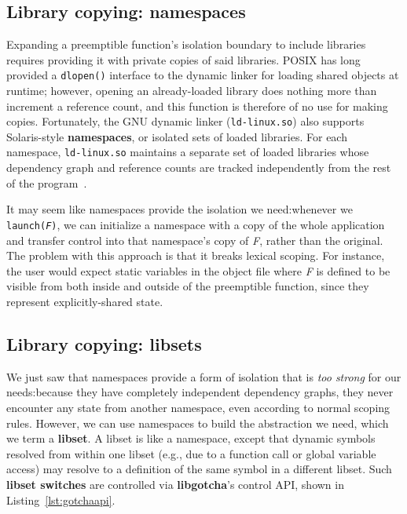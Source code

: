\subsection{Library copying: namespaces}

Expanding a preemptible function's isolation boundary to include libraries requires
providing it with private copies of said libraries.  POSIX has long provided a
\texttt{dlopen()} interface to the dynamic linker for loading shared objects at
runtime; however, opening an already-loaded library does nothing more than increment
a reference count, and this function is therefore of no use for making copies.
Fortunately, the GNU dynamic linker (\texttt{ld-linux.so}) also supports
Solaris-style \textbf{namespaces}, or isolated sets of loaded libraries.  For each
namespace, \texttt{ld-linux.so} maintains a separate set of loaded libraries whose
dependency graph and reference counts are tracked independently from the rest of the
program~\cite{dlmopen-manpage}.

It may seem like namespaces provide the isolation we need:\@ whenever we
\texttt{launch(\textnormal{\textit{F}})}, we can initialize a namespace with a copy
of the whole application and transfer control into that namespace's copy of
\textit{F}, rather than the original.  The problem with this approach is that it
breaks lexical scoping.  For instance, the user would expect static variables in the
object file where \textit{F} is defined to be visible from both inside and outside of
the preemptible function, since they represent explicitly-shared state.



\subsection{Library copying: libsets}

We just saw that namespaces provide a form of isolation that is \textit{too strong}
for our needs:\@ because they have completely independent dependency graphs, they
never encounter any state from another namespace, even according to normal scoping
rules.  However, we can use namespaces to build the abstraction we need, which we
term a \textbf{libset}.  A libset is like a namespace, except that dynamic symbols
resolved from within one libset (e.g., due to a function call or global variable
access) may resolve to a definition of the same symbol in a different libset.  Such
\textbf{libset switches} are controlled via \textbf{libgotcha}'s control API, shown
in Listing~\ref{lst:gotchaapi}.

